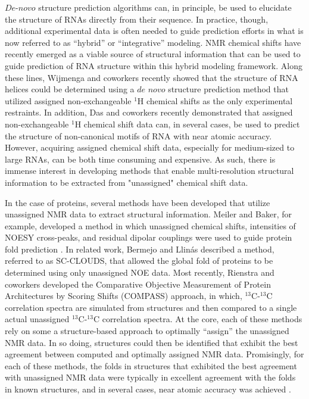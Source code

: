 \documentclass[journal=jcisd8,manuscript=article,layout=onecolumn]{achemso}
\begin{document}
$\textit{De-novo}$ structure prediction algorithms can, in principle, be used to elucidate the structure of RNAs directly from their sequence. In practice, though, additional experimental data is often needed to guide prediction efforts in what is now referred to as ``hybrid'' or ``integrative'' modeling\cite{burke2012structure, lee2016integrative}. NMR chemical shifts have recently emerged as a viable source of structural information that can be used to guide prediction of RNA structure within this hybrid modeling framework. Along these lines, Wijmenga and coworkers recently showed that the structure of RNA helices could be determined using a $\textit{de novo}$ structure prediction method that utilized assigned non-exchangeable $^{1}$H chemical shifts  as the only experimental restraints\cite{van2013nucleic}.  In addition, Das and coworkers recently demonstrated that assigned non-exchangeable $^{1}$H chemical shift  data can, in several cases, be used to predict the structure of non-canonical motifs of RNA with near atomic accuracy\cite{sripakdeevong2014structure}. However, acquiring assigned chemical shift data, especially for medium-sized to large RNAs, can be both time consuming and expensive. As such, there is immense interest in developing methods that enable multi-resolution structural information to be extracted from "unassigned" chemical shift data.

In the case of proteins, several methods have been developed that utilize unassigned NMR data to extract structural information. Meiler and Baker, for example, developed a method in which unassigned chemical shifts, intensities of NOESY cross-peaks, and residual dipolar couplings were used to guide protein fold prediction \cite{meiler2003rapid}. In related work, Bermejo and Llin{\'a}s described a method, referred to as SC-CLOUDS, that allowed the global fold of proteins to be determined using only unassigned NOE data\cite{bermejo2008deuterated}. Most recently, Rienstra and coworkers developed the Comparative Objective Measurement of Protein Architectures by Scoring Shifts (COMPASS) approach, in which, $^{13}$C-$^{13}$C correlation spectra are simulated from structures and then compared to a single actual unassigned  $^{13}$C-$^{13}$C correlation spectra\cite{courtney2015experimental}. At the core, each of these methods rely on some a structure-based approach to optimally ``assign'' the unassigned NMR data. In so doing, structures could then be identified that exhibit the best agreement between computed and optimally assigned NMR data. Promisingly, for each of these methods, the folds in structures that exhibited the best agreement with unassigned NMR data were typically in excellent agreement with the folds in known structures, and in several cases, near atomic accuracy was achieved \cite{meiler2003rapid, courtney2015experimental}. 
\end{document}
